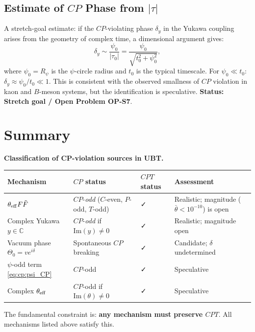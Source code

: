 \documentclass[12pt,a4paper]{article}
\theoremstyle{definition}
\theoremstyle{remark}
\begin{document}
\subsection{Estimate of $CP$ Phase from $|\tau|$}

A stretch-goal estimate: if the $CP$-violating phase $\delta_y$ in the Yukawa
coupling arises from the geometry of complex time, a dimensional argument gives:
\begin{equation}
  \delta_y \sim \frac{\psi_0}{|\tau_0|} = \frac{\psi_0}{\sqrt{t_0^2+\psi_0^2}},
  \label{eq:cp:phase_estimate}
\end{equation}
where $\psi_0 = R_\psi$ is the $\psi$-circle radius and $t_0$ is the typical
timescale.  For $\psi_0 \ll t_0$: $\delta_y \approx \psi_0/t_0 \ll 1$.
This is consistent with the observed smallness of $CP$ violation in
kaon and $B$-meson systems, but the identification is speculative.
\textbf{Status: Stretch goal / Open Problem OP-S7}.

\section{Summary}
\label{sec:cp:summary}

\begin{resultbox}
\textbf{Classification of CP-violation sources in UBT.}

\begin{center}
\begin{tabular}{@{}llll@{}}
\toprule
Mechanism & $CP$ status & $CPT$ status & Assessment \\
\midrule
$\theta_{\rm eff}F\tilde F$ & $CP$-\emph{odd} ($C$-even, $P$-odd, $T$-odd) & ✓ & Realistic; magnitude ($\bar\theta<10^{-10}$) is open \\
Complex Yukawa $y\in\mathbb{C}$ & $CP$-\emph{odd} if $\mathrm{Im}(y)\neq0$ & ✓ & Realistic; magnitude open \\
Vacuum phase $\Theta_0=ve^{i\delta}$ & Spontaneous $CP$ breaking & ✓ & Candidate; $\delta$ undetermined \\
$\psi$-odd term \eqref{eq:cp:psi_CP} & $CP$-odd & ✓ & Speculative \\
Complex $\theta_{\rm eff}$ & $CP$-odd if $\mathrm{Im}(\theta)\neq0$ & ✓ & Speculative \\
\bottomrule
\end{tabular}
\end{center}

The fundamental constraint is: \textbf{any mechanism must preserve $CPT$}.
All mechanisms listed above satisfy this.
\end{resultbox}

\ifdefined\INCLUDEMODE
\else
  
\end{document}
